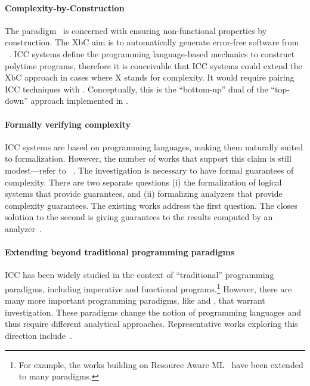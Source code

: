 \paragraph*{Complexity-by-Construction}
The  paradigm~\cite{terbeek2018} is concerned with
ensuring non-functional properties by
construction. The XbC aim is to automatically generate error-free software from
~\cite{terbeek2020}. ICC systems define the programming
language-based mechanics to construct polytime programs, therefore it is
conceivable that ICC systems could extend the XbC approach in cases where X
stands for complexity. It would require pairing ICC techniques with . Conceptually, this is the \enquote{bottom-up} dual of the
\enquote{top-down} approach implemented in .

\paragraph*{Formally verifying complexity}
ICC systems are based on programming languages, making them naturally suited
to formalization. However, the number of works that support this claim is
still modest---refer to \eg~\cite{feree2018,heraud2011,atkey2024}. The
investigation is necessary to have formal guarantees of complexity. There
are two separate questions (i) the formalization of logical systems that
provide guarantees, and (ii) formalizing analyzers that provide complexity
guarantees. The existing works address the first question. The closes
solution to the second is giving guarantees to the results computed by an
analyzer~\cite{carbonneaux2017}.

\paragraph*{Extending beyond traditional programming paradigms}
ICC has been widely studied in the context of \enquote{traditional} programming
paradigms, including imperative and functional programs.\footnote{ For example,
the works building on Resource Aware ML~\cite{hoffmann2012} have been extended
to many paradigms.} However, there are many more important programming
paradigms, like  and , that
warrant investigation. These paradigms change the notion of programming
languages and thus require different analytical approaches. Representative works
exploring this direction include~\cite{avanzini2024,colledan2024,avanzini2020}.

